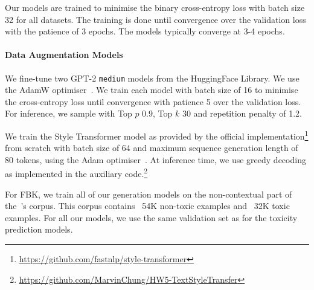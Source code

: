 \documentclass[acmsmall]{acmart}
\begin{document}
Our models are trained to minimise the binary cross-entropy loss with batch size 32 for all datasets. The training is done until convergence over the validation loss with the patience of 3 epochs. The models typically converge at 3-4 epochs.
 
\paragraph{Data Augmentation Models} 

We fine-tune two GPT-2 \texttt{medium} models from the HuggingFace Library. We use the AdamW optimiser~\cite{adamw}. We train each model with batch size of 16 to minimise the cross-entropy loss until convergence with patience 5 over the validation loss. For inference, we sample with Top $p$ 0.9, Top $k$ 30 and repetition penalty of 1.2.

We train the Style Transformer model as provided by the official implementation\footnote{\url{https://github.com/fastnlp/style-transformer}} from scratch with batch size of 64 and maximum sequence generation length of 80 tokens, using the Adam optimiser~\cite{adam}. At inference time, we use greedy decoding as implemented in the auxiliary code.\footnote{\url{https://github.com/MarvinChung/HW5-TextStyleTransfer}}

For FBK, we train all of our generation models on the non-contextual part of the~\cite{Antigoni}'s corpus. This corpus contains ~54K non-toxic examples and ~32K toxic examples. For all our models, we use the same validation set as for the toxicity prediction models.
\end{document}
